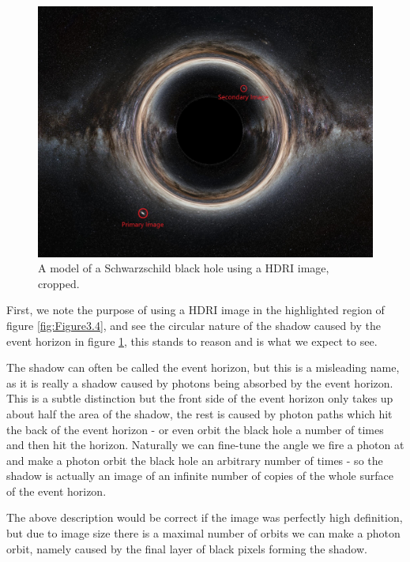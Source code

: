 \documentclass[oneside,openright,frontopenright, singlespacing]{dmathesis}
\begin{document}
\begin{figure}[!ht]
	\centering
	\includegraphics[width=0.8\linewidth]{img/milkyway-SC}
	\caption{A model of a Schwarzschild black hole using a HDRI image, cropped.}
	\label{fig:Figure3.5}
\end{figure}

	First, we note the purpose of using a HDRI image in the highlighted region of figure \ref{fig:Figure3.4}, and see the circular nature of the shadow caused by the event horizon in figure \ref{fig:Figure3.5}, this stands to reason and is what we expect to see. 

\vspace{1em}
	The shadow can often be called the event horizon, but this is a misleading name, as it is really a shadow caused by photons being absorbed by the event horizon. This is a subtle distinction but the front side of the event horizon only takes up about half the area of the shadow, the rest is caused by photon paths which hit the back of the event horizon - or even orbit the black hole a number of times and then hit the horizon. Naturally we can fine-tune the angle we fire a photon at and make a photon orbit the black hole an arbitrary number of times - so the shadow is actually an image of an infinite number of copies of the whole surface of the event horizon.

\vspace{1em}
	The above description would be correct if the image was perfectly high definition, but due to image size there is a maximal number of orbits we can make a photon orbit, namely caused by the final layer of black pixels forming the shadow.
\end{document}
